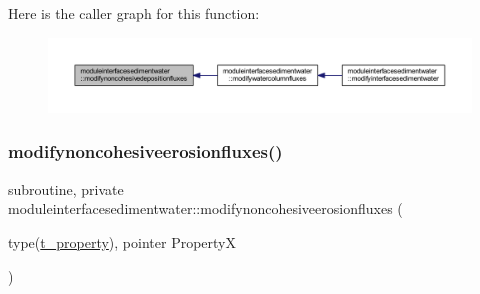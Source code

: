 Here is the caller graph for this function\+:\nopagebreak
\begin{figure}[H]
\begin{center}
\leavevmode
\includegraphics[width=350pt]{namespacemoduleinterfacesedimentwater_a9d8d2c2895ffd32b4cc15bfff20e9f7f_icgraph}
\end{center}
\end{figure}
\mbox{\label{namespacemoduleinterfacesedimentwater_a3ed9cede4da99e95712c02f4a8a6408a}} 
\subsubsection{\texorpdfstring{modifynoncohesiveerosionfluxes()}{modifynoncohesiveerosionfluxes()}}
{\footnotesize\ttfamily subroutine, private moduleinterfacesedimentwater\+::modifynoncohesiveerosionfluxes (\begin{DoxyParamCaption}\item[{type(\mbox{\hyperlink{structmoduleinterfacesedimentwater_1_1t__property}{t\+\_\+property}}), pointer}]{PropertyX }\end{DoxyParamCaption})\hspace{0.3cm}{\ttfamily [private]}}

